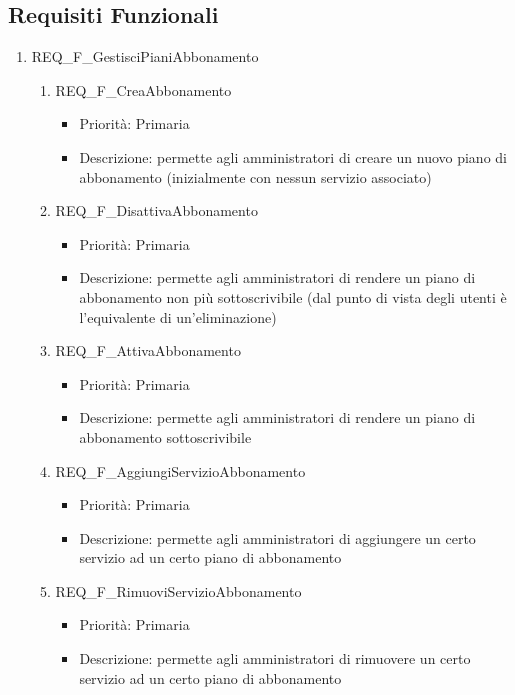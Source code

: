 \subsection{Requisiti Funzionali}
\begin{enumerate}
	

	\item REQ\_F\_GestisciPianiAbbonamento
		\begin{enumerate}[label*=\arabic*.]      
		\item REQ\_F\_CreaAbbonamento
			\begin{itemize}	
			\item Priorità: Primaria
			\item Descrizione: permette agli amministratori di creare un nuovo piano di abbonamento (inizialmente con nessun servizio associato)
			\end{itemize}
		\item REQ\_F\_DisattivaAbbonamento
			\begin{itemize}	
			\item Priorità: Primaria
			\item Descrizione: permette agli amministratori di rendere un piano di abbonamento non più sottoscrivibile (dal punto di vista degli utenti è l'equivalente di un'eliminazione)
			\end{itemize}
		\item REQ\_F\_AttivaAbbonamento
			\begin{itemize}
			\item Priorità: Primaria
			\item Descrizione: permette agli amministratori di rendere un piano di abbonamento sottoscrivibile
			\end{itemize}
		\item REQ\_F\_AggiungiServizioAbbonamento
			\begin{itemize}	
			\item Priorità: Primaria
			\item Descrizione: permette agli amministratori di aggiungere un certo servizio ad un certo piano di abbonamento
			\end{itemize}
		\item REQ\_F\_RimuoviServizioAbbonamento
			\begin{itemize}	
			\item Priorità: Primaria
			\item Descrizione: permette agli amministratori di rimuovere un certo servizio ad un certo piano di abbonamento

\end{itemize}
\end{enumerate}
\end{enumerate}
